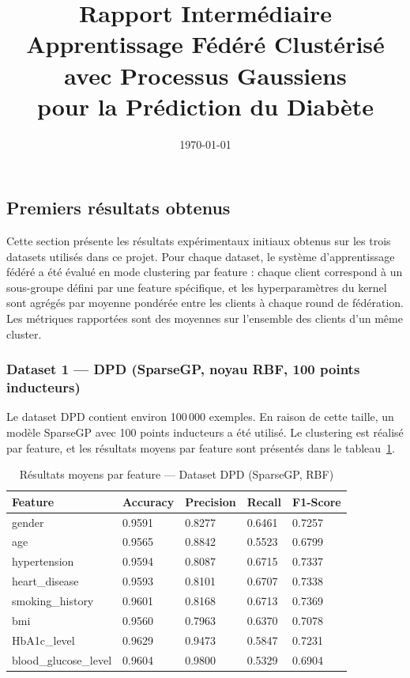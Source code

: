 \documentclass[12pt,a4paper]{article}
\title{Rapport Intermédiaire\\
\large Apprentissage Fédéré Clustérisé avec Processus Gaussiens\\
pour la Prédiction du Diabète}
\author{}
\date{\today}
\begin{document}
\maketitle


\subsection{Premiers résultats obtenus}

Cette section présente les résultats expérimentaux initiaux obtenus sur les trois datasets utilisés dans ce projet. Pour chaque dataset, le système d'apprentissage fédéré a été évalué en mode clustering par feature : chaque client correspond à un sous-groupe défini par une feature spécifique, et les hyperparamètres du kernel sont agrégés par moyenne pondérée entre les clients à chaque round de fédération. Les métriques rapportées sont des moyennes sur l'ensemble des clients d'un même cluster.

\subsubsection*{Dataset 1 — DPD (SparseGP, noyau RBF, 100 points inducteurs)}

Le dataset DPD contient environ 100\,000 exemples. En raison de cette taille, un modèle SparseGP avec 100 points inducteurs a été utilisé. Le clustering est réalisé par feature, et les résultats moyens par feature sont présentés dans le tableau~\ref{tab:dpd_results}.

\begin{table}[H]
\centering
\caption{Résultats moyens par feature — Dataset DPD (SparseGP, RBF)}
\label{tab:dpd_results}
\small
\begin{tabular}{p{3.5cm}p{2.5cm}p{2.5cm}p{2.5cm}p{2.5cm}}
\hline
\textbf{Feature} & \textbf{Accuracy} & \textbf{Precision} & \textbf{Recall} & \textbf{F1-Score} \\
\hline
gender               & 0.9591 & 0.8277 & 0.6461 & 0.7257 \\
age                  & 0.9565 & 0.8842 & 0.5523 & 0.6799 \\
hypertension         & 0.9594 & 0.8087 & 0.6715 & 0.7337 \\
heart\_disease        & 0.9593 & 0.8101 & 0.6707 & 0.7338 \\
smoking\_history     & 0.9601 & 0.8168 & 0.6713 & 0.7369 \\
bmi                  & 0.9560 & 0.7963 & 0.6370 & 0.7078 \\
HbA1c\_level         & 0.9629 & 0.9473 & 0.5847 & 0.7231 \\
blood\_glucose\_level & 0.9604 & 0.9800 & 0.5329 & 0.6904 \\
\hline
\end{tabular}
\end{table}
\end{document}
